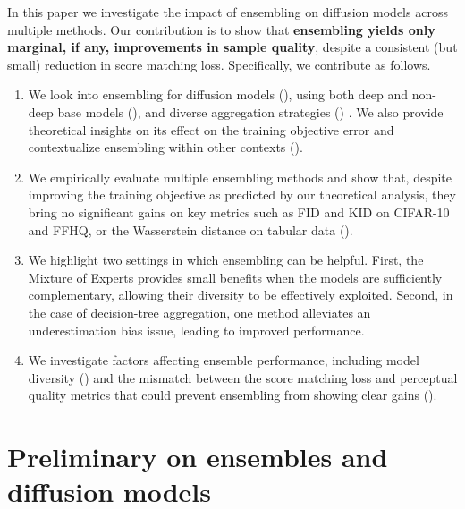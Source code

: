 \documentclass[10pt]{article} %
\begin{document}
In this paper we investigate the impact of ensembling on diffusion models across multiple methods. Our contribution is to show that \textbf{ensembling yields only marginal, if any, improvements in sample quality}, despite a consistent (but small) reduction in score matching loss. Specifically, we contribute as follows.

\begin{enumerate}[itemsep=0pt, topsep=0pt, leftmargin=1.5em]

    \item We look into ensembling for diffusion models (), using both deep and non-deep base models (), and diverse aggregation strategies () 
. We also provide theoretical insights on its effect on the training objective error and contextualize ensembling within other contexts
().%
    \item We empirically evaluate multiple ensembling methods and show that, despite improving the training objective as predicted by our theoretical analysis, they bring no significant gains on key metrics such as FID and KID on CIFAR-10 and FFHQ, or the Wasserstein distance on tabular data (). 

    \item We highlight two settings in which ensembling can be helpful. First, the Mixture of Experts provides small benefits when the models are sufficiently complementary, allowing their diversity to be effectively exploited. Second, in the case of decision-tree aggregation, one method alleviates an underestimation bias issue, leading to improved performance.

    
    \item We investigate factors affecting ensemble performance, including model diversity () and the mismatch between the score matching loss and perceptual quality metrics that could prevent ensembling from showing clear gains ().
    

\end{enumerate}

\section{Preliminary on ensembles and diffusion models}
\end{document}
